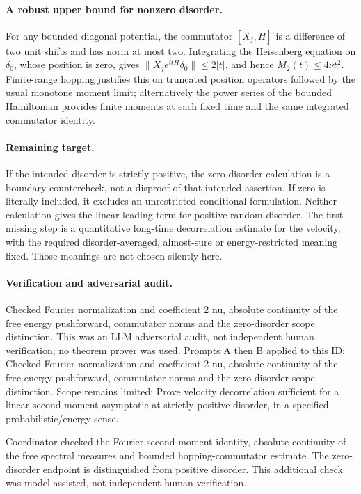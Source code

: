\documentclass[11pt]{article}
\begin{document}
\paragraph{A robust upper bound for nonzero disorder.}For any bounded diagonal potential, the commutator \([X_j,H]\) is a difference of two unit shifts and has norm at most two. Integrating the Heisenberg equation on \(\delta_0\), whose position is zero, gives \(\|X_je^{itH}\delta_0\|\le2|t|\), and hence \(M_2(t)\le4\nu t^2\). Finite-range hopping justifies this on truncated position operators followed by the usual monotone moment limit; alternatively the power series of the bounded Hamiltonian provides finite moments at each fixed time and the same integrated commutator identity.
\paragraph{Remaining target.}If the intended disorder is strictly positive, the zero-disorder calculation is a boundary countercheck, not a disproof of that intended assertion. If zero is literally included, it excludes an unrestricted conditional formulation. Neither calculation gives the linear leading term for positive random disorder. The first missing step is a quantitative long-time decorrelation estimate for the velocity, with the required disorder-averaged, almost-sure or energy-restricted meaning fixed. Those meanings are not chosen silently here.

\paragraph{Verification and adversarial audit.}
Checked Fourier normalization and coefficient 2 nu, absolute continuity of the free energy pushforward, commutator norms and the zero-disorder scope distinction. This was an LLM adversarial audit, not independent human verification; no theorem prover was used. Prompts A then B applied to this ID: Checked Fourier normalization and coefficient 2 nu, absolute continuity of the free energy pushforward, commutator norms and the zero-disorder scope distinction. Scope remains limited: Prove velocity decorrelation sufficient for a linear second-moment asymptotic at strictly positive disorder, in a specified probabilistic/energy sense.

Coordinator checked the Fourier second-moment identity, absolute continuity of the free spectral measures and bounded hopping-commutator estimate. The zero-disorder endpoint is distinguished from positive disorder. This additional check was model-assisted, not independent human verification.
\end{document}
